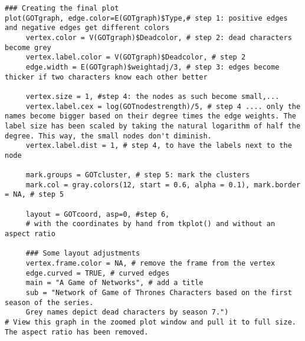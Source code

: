 \begin{lstlisting}[caption={Creating the plot of all characters.}, label={lstlisting:plot}] 
### Creating the final plot
plot(GOTgraph, edge.color=E(GOTgraph)$Type,# step 1: positive edges and negative edges get different colors
     vertex.color = V(GOTgraph)$Deadcolor, # step 2: dead characters become grey
     vertex.label.color = V(GOTgraph)$Deadcolor, # step 2
     edge.width = E(GOTgraph)$weightadj/3, # step 3: edges become thicker if two characters know each other better
     
     vertex.size = 1, #step 4: the nodes as such become small,...
     vertex.label.cex = log(GOTnodestrength)/5, # step 4 .... only the names become bigger based on their degree times the edge weights. The label size has been scaled by taking the natural logarithm of half the degree. This way, the small nodes don't diminish.
     vertex.label.dist = 1, # step 4, to have the labels next to the node
     
     mark.groups = GOTcluster, # step 5: mark the clusters
     mark.col = gray.colors(12, start = 0.6, alpha = 0.1), mark.border = NA, # step 5
     
     layout = GOTcoord, asp=0, #step 6,
     # with the coordinates by hand from tkplot() and without an aspect ratio
     
     ### Some layout adjustments
     vertex.frame.color = NA, # remove the frame from the vertex
     edge.curved = TRUE, # curved edges
     main = "A Game of Networks", # add a title
     sub = "Network of Game of Thrones Characters based on the first season of the series.
     Grey names depict dead characters by season 7.") 
# View this graph in the zoomed plot window and pull it to full size. The aspect ratio has been removed. 
\end{lstlisting}